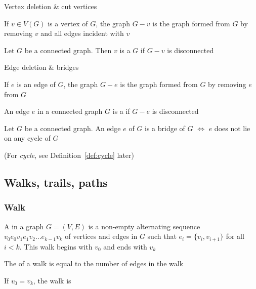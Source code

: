 \documentclass[aspectratio=169]{beamer}\usepackage[]{graphicx}\usepackage[]{xcolor}
\begin{document}
\begin{frame}{Vertex deletion \& cut vertices}
\begin{definition}
If $v\in V(G)$ is a vertex of $G$, the graph $G-v$ is the graph formed from $G$ by removing $v$ and all edges incident with $v$
\end{definition}
\vfill
\begin{definition}
	Let $G$ be a connected graph. Then $v$ is a  $G$ if $G-v$ is disconnected
\end{definition}
\end{frame}


\begin{frame}{Edge deletion \& bridges}
\begin{definition}
	If $e$ is an edge of $G$, the graph $G-e$ is the graph formed from $G$ by removing $e$ from $G$
\end{definition}
\vfill
\begin{definition}[{Bridge}]
An edge $e$ in a connected graph $G$ is a  if $G-e$ is disconnected
\end{definition}
\vfill
\begin{theorem}
Let $G$ be a connected graph. An edge $e$ of $G$ is a bridge of $G$ $\iff$ $e$ does not lie on any cycle of $G$
\end{theorem}
(For \emph{cycle}, see Definition~\ref{def:cycle} later)
\end{frame}





\subsection{Walks, trails, paths}


\begin{frame}\frametitle{Walk}
\begin{definition}[{Walk}]
A  in a graph $G=(V,E)$ is a non-empty alternating sequence $v_0 e_0 v_1 e_1 v_2 \dots e_{k-1} v_k$ of vertices and edges in $G$ such that $e_i=\{v_i, v_{i+1}\}$ for all $i<k$. 
This walk begins with $v_0$ and ends with $v_k$
\end{definition}
\vfill
\begin{definition}
The  of a walk is equal to the number of edges in the walk
\end{definition}
\vfill
\begin{definition}
If $v_0=v_k$, the walk is 
\end{definition}
\end{frame}
\end{document}
